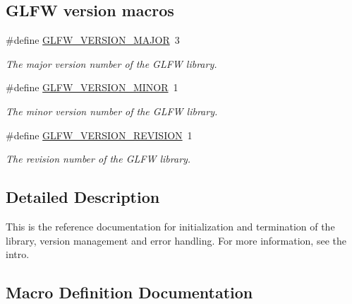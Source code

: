 \subsection*{G\+L\+F\+W version macros}
\begin{DoxyCompactItemize}
\item 
\#define \hyperlink{group__init_ga6337d9ea43b22fc529b2bba066b4a576}{G\+L\+F\+W\+\_\+\+V\+E\+R\+S\+I\+O\+N\+\_\+\+M\+A\+J\+O\+R}~3
\begin{DoxyCompactList}\small\item\em The major version number of the G\+L\+F\+W library. \end{DoxyCompactList}\item 
\#define \hyperlink{group__init_gaf80d40f0aea7088ff337606e9c48f7a3}{G\+L\+F\+W\+\_\+\+V\+E\+R\+S\+I\+O\+N\+\_\+\+M\+I\+N\+O\+R}~1
\begin{DoxyCompactList}\small\item\em The minor version number of the G\+L\+F\+W library. \end{DoxyCompactList}\item 
\#define \hyperlink{group__init_gab72ae2e2035d9ea461abc3495eac0502}{G\+L\+F\+W\+\_\+\+V\+E\+R\+S\+I\+O\+N\+\_\+\+R\+E\+V\+I\+S\+I\+O\+N}~1
\begin{DoxyCompactList}\small\item\em The revision number of the G\+L\+F\+W library. \end{DoxyCompactList}\end{DoxyCompactItemize}


\subsection{Detailed Description}
This is the reference documentation for initialization and termination of the library, version management and error handling. For more information, see the intro. 

\subsection{Macro Definition Documentation}
\hypertarget{group__init_ga6337d9ea43b22fc529b2bba066b4a576}{}
